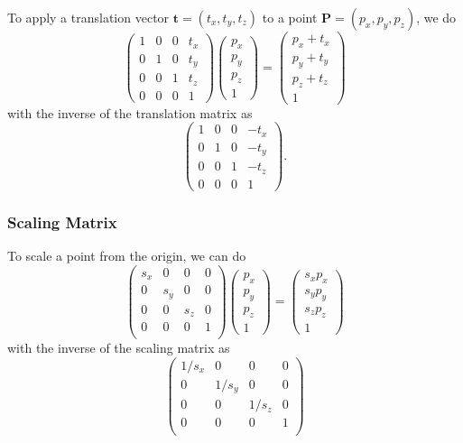 \documentclass[twocolumn,landscape,10pt]{article}
\theoremstyle{definition}
\begin{document}
To apply a translation vector $\mathbf{t}=(t_x,t_y,t_z)$ to a point
$\mathbf{P}=(p_x,p_y,p_z)$, we do
\[
    \begin{pmatrix}
        1 & 0 & 0 & t_x \\
        0 & 1 & 0 & t_y \\
        0 & 0 & 1 & t_z \\
        0 & 0 & 0 & 1
    \end{pmatrix} 
    \begin{pmatrix}
        p_x \\
        p_y \\
        p_z \\
        1
    \end{pmatrix} 
    =
    \begin{pmatrix}
        p_x + t_x \\
        p_y + t_y \\
        p_z + t_z \\
        1
    \end{pmatrix} 
\]
with the inverse of the translation matrix as
\[
    \begin{pmatrix}
        1 & 0 & 0 & -t_x \\
        0 & 1 & 0 & -t_y \\
        0 & 0 & 1 & -t_z \\
        0 & 0 & 0 & 1
    \end{pmatrix}.
\]

\subsubsection{Scaling Matrix}

To scale a point from the origin, we can do
\[
    \begin{pmatrix}
        s_x & 0 & 0 & 0 \\
        0 & s_y & 0 & 0 \\
        0 & 0 & s_z & 0 \\
        0 & 0 & 0 & 1 \\
    \end{pmatrix} 
    \begin{pmatrix}
        p_x \\
        p_y \\
        p_z \\
        1
    \end{pmatrix} 
    =
    \begin{pmatrix}
        s_xp_x \\
        s_yp_y \\
        s_zp_z \\
        1
    \end{pmatrix} 
\]
with the inverse of the scaling matrix as
\[
    \begin{pmatrix}
        1/s_x & 0 & 0 & 0 \\
        0 & 1/s_y & 0 & 0 \\
        0 & 0 & 1/s_z & 0 \\
        0 & 0 & 0 & 1 \\
    \end{pmatrix} 
\]
\end{document}
